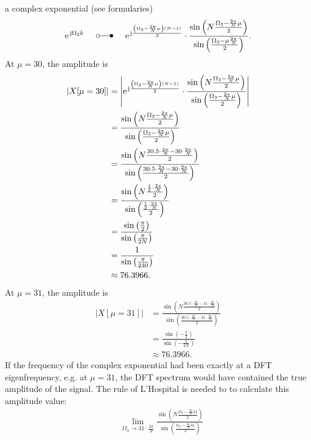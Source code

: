 \documentclass[11pt,a4paper,DIV=12]{scrartcl}
\begin{document}
\begin{Loesung}
\begin{enumerate}[label=\alph*)]
	a complex exponential (see formularies)
%
	\begin{equation}
	\e^{\im\Omega_3 k} \hspace{5mm}\laplace\hspace{5mm} \e^{\im\frac{\left(\Omega_3-\frac{2\pi}{N}\mu\right)(N-1)}{2}}\cdot\frac{\sin\left(N\frac{\Omega_3-\frac{2\pi}{N}\mu}{2}\right)}{\sin\left(\frac{\Omega_3-\mu\frac{2\pi}{N}}{2}\right)}.\nonumber
	\end{equation}
%
	At $\mu=30$, the amplitude is
%
	\begin{align}
	|X[\mu=30]|&=\left|\e^{\im\frac{\left(\Omega_3-\frac{2\pi}{N}\mu\right)(N-1)}{2}}\cdot\frac{\sin\left(N\frac{\Omega_3-\frac{2\pi}{N}\mu}{2}\right)}{\sin\left(\frac{\Omega_3-\frac{2\pi}{N}\mu}{2}\right)}\right|\nonumber\\
	&=\frac{\sin\left(N\frac{\Omega_3-\frac{2\pi}{N}\mu}{2}\right)}{\sin\left(\frac{\Omega_3-\frac{2\pi}{N}\mu}{2}\right)}\nonumber\\
	&=\frac{\sin\left(N\frac{30.5\cdot\frac{2\pi}{N}-30\cdot\frac{2\pi}{N}}{2}\right)}{\sin\left(\frac{30.5\cdot\frac{2\pi}{N}-30\cdot\frac{2\pi}{N}}{2}\right)}\nonumber\\
	&=\frac{\sin\left(N\frac{\frac{1}{2}\cdot\frac{2\pi}{N}}{2}\right)}{\sin\left(\frac{\frac{1}{2}\cdot\frac{2\pi}{N}}{2}\right)}\nonumber\\
	&=\frac{\sin\left(\frac{\pi}{2}\right)}{\sin\left(\frac{\pi}{2N}\right)}\nonumber\\
	&=\frac{1}{\sin\left(\frac{\pi}{240}\right)}\nonumber\\
	&\approx76.3966.\nonumber
	\end{align}
%
	At $\mu=31$, the amplitude is
%
	\begin{align}
	|X[\mu=31]|&=\frac{\sin\left(N\frac{30.5\cdot\frac{2\pi}{N}-31\cdot\frac{2\pi}{N}}{2}\right)}{\sin\left(\frac{30.5\cdot\frac{2\pi}{N}-31\cdot\frac{2\pi}{N}}{2}\right)}\nonumber\\
	&=\frac{\sin\left(-\frac{\pi}{2}\right)}{\sin\left(-\frac{\pi}{2N}\right)}\nonumber\\
	&\approx76.3966.\nonumber
	\end{align}
%
	If the frequency of the complex exponential had been exactly at a DFT
	eigenfrequency, e.g. at $\mu=31$, the DFT spectrum would have contained the
	true amplitude of the signal.
	The rule of L'Hospital is needed to to calculate this amplitude value:
%
	\begin{align}
	&\lim_{\Omega_3\to31\cdot\frac{2\pi}{N}}\frac{\sin\left(N\frac{\Omega_3-\frac{2\pi}{N}31}{2}\right)}{\sin\left(\frac{\Omega_3-\frac{2\pi}{N}31}{2}\right)}\nonumber\\

\end{align}
\end{enumerate}
\end{Loesung}
\end{document}
